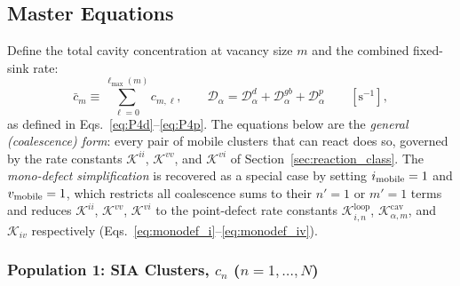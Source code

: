 \documentclass[pdflatex,sn-basic]{sn-jnl} %
\begin{document}
\subsection{Master Equations}
\label{sec:master_eq}

Define the total cavity concentration at vacancy size $m$ and the
combined fixed-sink rate:
\begin{equation}\label{eq:cbar}
    \bar{c}_m \equiv \sum_{\ell=0}^{\ell_{\max}(m)} c_{m,\ell},
    \qquad
    \mathcal{D}_\alpha
    = \mathcal{D}_\alpha^d + \mathcal{D}_\alpha^{gb}
    + \mathcal{D}_\alpha^p
    \qquad [\text{s}^{-1}],
\end{equation}
as defined in Eqs.~\eqref{eq:P4d}--\eqref{eq:P4p}. The equations below
are the \emph{general (coalescence) form}: every pair of mobile clusters
that can react does so, governed by the rate constants
$\mathcal{K}^{ii}$, $\mathcal{K}^{vv}$, and $\mathcal{K}^{vi}$ of
Section~\ref{sec:reaction_class}. The \emph{mono-defect simplification}
is recovered as a special case by setting $i_{\rm mobile} = 1$ and
$v_{\rm mobile} = 1$, which restricts all coalescence sums to their $n'=1$
or $m'=1$ terms and reduces $\mathcal{K}^{ii}$, $\mathcal{K}^{vv}$,
$\mathcal{K}^{vi}$ to the point-defect rate constants
$\mathcal{K}_{i,n}^{\mathrm{loop}}$,
$\mathcal{K}_{\alpha,m}^{\mathrm{cav}}$, and $\mathcal{K}_{iv}$
respectively (Eqs.~\ref{eq:monodef_i}--\ref{eq:monodef_iv}).


\subsubsection{Population 1: SIA Clusters, $c_n$\; ($n = 1,\ldots,N$)}
\label{sec:ME_SIA}
\end{document}
